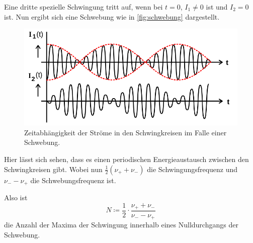 Eine dritte spezielle Schwingung tritt auf, wenn bei $t=0$, $I_1 \neq 0$ ist und $I_2 = 0$ ist. Nun ergibt sich eine Schwebung wie in \autoref{fig:schwebung} dargestellt.
\begin{figure}
    \centering
    \includegraphics[width=\textwidth/2]{images/schwebung.png}
    \caption{Zeitabhängigkeit der Ströme in den Schwingkreisen im Falle einer Schwebung. \cite{V355}}
    \label{fig:schwebung}
\end{figure}

Hier lässt sich sehen, dass es einen periodischen Energieaustausch zwischen den Schwingkreisen gibt. 
Wobei nun $\frac{1}{2} (\nu _+ + \nu _-)$ die Schwingungsfrequenz und $\nu _- - \nu _+$ die Schwebungsfrequenz ist.\cite{V355}

Also ist 
\begin{equation}
    \label{eq:extrema}
    N \coloneq \frac{1}{2} \cdot \frac{ \nu _+ + \nu _-}{\nu _- - \nu _+}
\end{equation}
die Anzahl der Maxima der Schwingung innerhalb eines Nulldurchgangs der Schwebung.